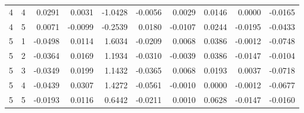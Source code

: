\begin{tabular}{rrrrrrrrrr}
4 & 4 & 0.0291 & 0.0031 & -1.0428 & -0.0056 & 0.0029 & 0.0146 & 0.0000 & -0.0165 \\
4 & 5 & 0.0071 & -0.0099 & -0.2539 & 0.0180 & -0.0107 & 0.0244 & -0.0195 & -0.0433 \\
5 & 1 & -0.0498 & 0.0114 & 1.6034 & -0.0209 & 0.0068 & 0.0386 & -0.0012 & -0.0748 \\
5 & 2 & -0.0364 & 0.0169 & 1.1934 & -0.0310 & -0.0039 & 0.0386 & -0.0147 & -0.0104 \\
5 & 3 & -0.0349 & 0.0199 & 1.1432 & -0.0365 & 0.0068 & 0.0193 & 0.0037 & -0.0718 \\
5 & 4 & -0.0439 & 0.0307 & 1.4272 & -0.0561 & -0.0010 & 0.0000 & -0.0012 & -0.0677 \\
5 & 5 & -0.0193 & 0.0116 & 0.6442 & -0.0211 & 0.0010 & 0.0628 & -0.0147 & -0.0160 \\
\bottomrule
\end{tabular}
